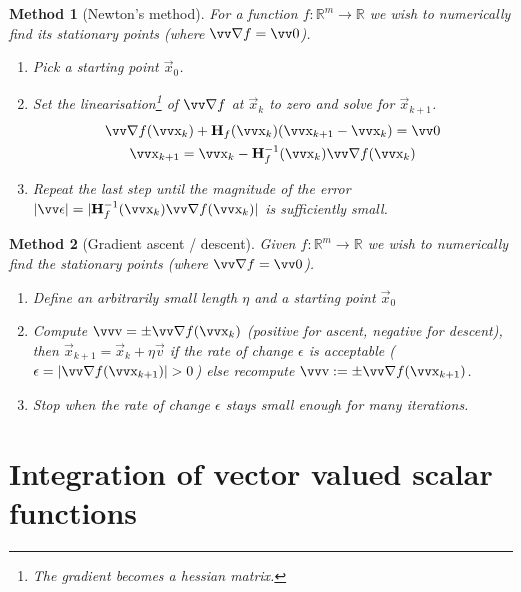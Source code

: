 \documentclass[twocolumn, margin=small]{tex/hsrzf}
\theoremstyle{fuvarzf}
\newtheorem{method}{Method}
\begin{document}
\begin{method}[Newton's method]
  For a function \(f:\mathbb{R}^m\to\mathbb{R}\) we wish to numerically find
  its stationary points (where \(\grad f = \vec{0}\)).
  \begin{enumerate}
    \item Pick a starting point \(\vec{x}_0\).
    \item Set the linearisation\footnote{The gradient becomes a hessian matrix.}
      of \(\grad f\) at \(\vec{x}_k\) to zero and
      solve for \(\vec{x}_{k+1}\).
      \begin{gather*}
        \grad f(\vec{x}_k) + \mx{H}_f (\vec{x}_k)
          (\vec{x}_{k+1} - \vec{x}_k) = \vec{0} \\
          \vec{x}_{k+1} = \vec{x}_k - \mx{H}_f^{-1} (\vec{x}_k) \grad f(\vec{x}_k)
      \end{gather*}
    \item Repeat the last step until the magnitude of the error
      \(|\vec{\epsilon}| = |\mx{H}_f^{-1} (\vec{x}_k) \grad f(\vec{x}_k)|\) is
      sufficiently small.
  \end{enumerate}
\end{method}

\begin{method}[Gradient ascent / descent]
  Given \(f:\mathbb{R}^m\to\mathbb{R}\) we wish to numerically find
  the stationary points (where \(\grad f = \vec{0}\)).
  \begin{enumerate}
    \item Define an arbitrarily small length \(\eta\) and a starting point
      \(\vec{x}_0\)
    \item Compute \(\vec{v} = \pm\grad f(\vec{x}_k)\) (positive for ascent,
      negative for descent), then \(\vec{x}_{k+1} = \vec{x}_k + \eta\vec{v}\)
      if the rate of change \(\epsilon\) is acceptable (\(\epsilon = |\grad
      f(\vec{x}_{k+1})| > 0\)) else recompute \(\vec{v} := \pm \grad
      f(\vec{x}_{k+1})\).
    \item Stop when the rate of change \(\epsilon\) stays small enough for many
      iterations.
  \end{enumerate}
\end{method}

\section{Integration of vector valued scalar functions}
\end{document}
